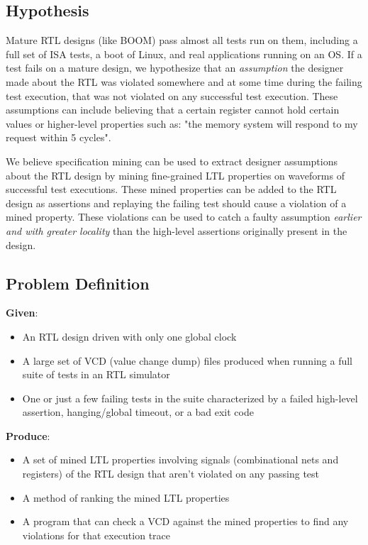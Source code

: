 \documentclass[acmlarge,11pt,nonacm]{acmart}
\begin{document}
\subsection{Hypothesis}
Mature RTL designs (like BOOM) pass almost all tests run on them, including a full set of ISA tests, a boot of Linux, and real applications running on an OS.
If a test fails on a mature design, we hypothesize that an \textit{assumption} the designer made about the RTL was violated somewhere and at some time during the failing test execution, that was not violated on any successful test execution.
These assumptions can include believing that a certain register cannot hold certain values or higher-level properties such as: "the memory system will respond to my request within 5 cycles".

We believe specification mining can be used to extract designer assumptions about the RTL design by mining fine-grained LTL properties on waveforms of successful test executions.
These mined properties can be added to the RTL design as assertions and replaying the failing test should cause a violation of a mined property.
These violations can be used to catch a faulty assumption \textit{earlier and with greater locality} than the high-level assertions originally present in the design.

\subsection{Problem Definition}
\par
\textbf{Given}:
\begin{itemize}
  \item An RTL design driven with only one global clock
  \item A large set of VCD (value change dump) files produced when running a full suite of tests in an RTL simulator
  \item One or just a few failing tests in the suite characterized by a failed high-level assertion, hanging/global timeout, or a bad exit code
\end{itemize}
\textbf{Produce}:
\begin{itemize}
  \item A set of mined LTL properties involving signals (combinational nets and registers) of the RTL design that aren't violated on any passing test
  \item A method of ranking the mined LTL properties
  \item A program that can check a VCD against the mined properties to find any violations for that execution trace
\end{itemize}
\end{document}
